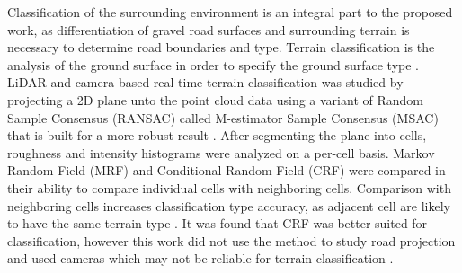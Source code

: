 \documentclass[journal,onecolumn]{IEEEtran}
\begin{document}
	{Classification of the surrounding environment is an integral part to the proposed work, as differentiation of gravel road surfaces and surrounding terrain is necessary to determine road boundaries and type. Terrain classification is the analysis of the ground surface in order to specify the ground surface type \cite{laible_3d_2012,laible_terrain_2013,laible_map_building,rasmussen_combining_2002,reymann_improving_2015,walas_terrain_2014,wietrzykowski_boosting_2014,wang_road_nodate}. LiDAR and camera based real-time terrain classification was studied by projecting a 2D plane unto the point cloud data using a variant of Random Sample Consensus (RANSAC) called M-estimator Sample Consensus (MSAC) \cite{mijakovska_generating_2014} that is built for a more robust result \cite{laible_3d_2012,laible_map_building,laible_terrain_2013}. After segmenting the plane into cells, roughness and intensity histograms were analyzed on a per-cell basis. Markov Random Field (MRF) \cite{chellappa_classification_1985} and Conditional Random Field (CRF) \cite{wallach_conditional_nodate} were compared in their ability to compare individual cells with neighboring cells. Comparison with neighboring cells increases classification type accuracy, as adjacent cell are likely to have the same terrain type \cite{haselich_terrain_2011,zhao_fusion_2014}. It was found that CRF was better suited for classification, however this work did not use the method to study road projection and used cameras which may not be reliable for terrain classification \cite{levi_3d_2012_light}.}
\end{document}
